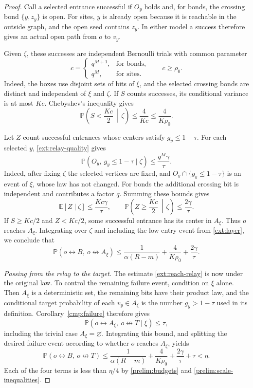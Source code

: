 \begin{proof}
Call a selected entrance successful if $O_y$ holds and, for bonds,
the crossing bond $\{y,z_y\}$ is open. For sites, $y$ is already
open because it is reachable in the outside graph, and the open
seed contains $z_y$. In either model a success therefore gives an
actual open path from $o$ to $v_y$.

Given $\zeta$, these successes are independent Bernoulli trials with
common parameter
\[
 c=\begin{cases}
 q^{M+1},&\text{for bonds},\\
 q^M,&\text{for sites}.
 \end{cases}
 \qquad c\ge\rho_0.
\]
Indeed, the boxes use disjoint sets of bits of $\xi$, and the selected
crossing bonds are distinct and independent of $\xi$ and $\zeta$.
If $S$ counts successes, its conditional variance is at most $Kc$.
Chebyshev's inequality gives
\begin{equation}
 \mathbb P\left(S<\frac{Kc}{2}\,\middle|\,\zeta\right)
 \le \frac{4}{Kc}\le\frac{4}{K\rho_0}.
 \label{ext:success-count}
\end{equation}

Let $Z$ count successful entrances whose centers satisfy $g_y\le1-\tau$.
For each selected $y$, \eqref{ext:relay-quality} gives
\[
 \mathbb P(O_y,\ g_y\le1-\tau\mid\zeta)
 \le\frac{q^M\gamma}{\tau}.
\]
Indeed, after fixing $\zeta$ the selected vertices are fixed, and
$O_y\cap\{g_y\le1-\tau\}$ is an event of $\xi$, whose law has not
changed. For bonds the additional crossing bit is independent and
contributes a factor $q$. Summing these bounds gives
\[
 \mathbb E[Z\mid\zeta]\le\frac{Kc\gamma}{\tau},
 \qquad
 \mathbb P\left(Z\ge\frac{Kc}{2}\,\middle|\,\zeta\right)
 \le\frac{2\gamma}{\tau}.
\]
If $S\ge Kc/2$ and $Z<Kc/2$, some successful entrance has its center
in $A_\xi$. Thus $o$ reaches $A_\xi$. Integrating over $\zeta$ and
including the low-entry event from \eqref{ext:layer}, we conclude that
\begin{equation}
 \mathbb P(o\leftrightarrow B,\ o\not\leftrightarrow A_\xi)
 \le \frac{1}{\alpha(R-m)}
       +\frac{4}{K\rho_0}+\frac{2\gamma}{\tau}.
 \label{ext:reach-relay}
\end{equation}

\emph{Passing from the relay to the target.}
The estimate \eqref{ext:reach-relay} is now under the original law.
To control the remaining failure event, condition on $\xi$ alone.
Then $A_\xi$ is a deterministic set, the remaining bits have their
product law, and the conditional target probability of each
$v_y\in A_\xi$ is the number $g_y>1-\tau$ used in its definition.
Corollary~\ref{cmp:failure} therefore gives
\[
 \mathbb P(o\leftrightarrow A_\xi,\ o\not\leftrightarrow T
             \mid\xi)\le\tau,
\]
including the trivial case $A_\xi=\varnothing$.
Integrating this bound, and splitting the desired failure event
according to whether $o$ reaches $A_\xi$, yields
\[
 \mathbb P(o\leftrightarrow B,\ o\not\leftrightarrow T)
 \le\frac{1}{\alpha(R-m)}
 +\frac{4}{K\rho_0}+\frac{2\gamma}{\tau}+\tau<\eta.
\]
Each of the four terms is less than $\eta/4$ by
\eqref{prelim:budgets} and \eqref{prelim:scale-inequalities}.
\end{proof}
